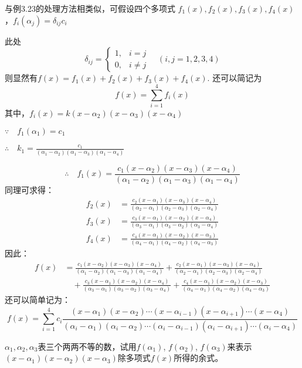 \begin{solution}
    与例3.23的处理方法相类似，可假设四个多项式
$f_1(x),f_2(x),f_3(x),f_4(x)$，$f_i(\alpha_j)=\delta_{ij}c_i$    
    
    此处$$\delta_{ij}=\begin{cases}
        1,& i=j\\
        0,& i\ne j
    \end{cases}\quad  (i,j=1, 2, 3, 4)$$
则显然有$f(x)=f_1(x)+f_2(x)+f_3(x)+f_4(x)$.
还可以简记为$$f(x)=\sum^4_{i=1}f_i(x)$$
其中，$f_i(x)=k(x-\alpha_2)(x-\alpha_3)(x-\alpha_4)$

$\because\quad f_1(\alpha_1)=c_1$

$\therefore\quad k_1=\frac{c_1}{(\alpha_1-\alpha_2)(\alpha_1-\alpha_3)(\alpha_1-\alpha_4)}$

\[\therefore\quad f_1(x)=\frac{c_1(x-\alpha_2)(x-\alpha_3)(x-\alpha_4)}{(\alpha_1-\alpha_2)(\alpha_1-\alpha_3)(\alpha_1-\alpha_4)}\]
同理可求得：
\[\begin{split}
    f_2(x)&=\frac{c_2(x-\alpha_1)(x-\alpha_3)(x-\alpha_4)}{(\alpha_2-\alpha_1)(\alpha_2-\alpha_3)(\alpha_2-\alpha_4)}\\
    f_3(x)&=\frac{c_3(x-\alpha_1)(x-\alpha_2)(x-\alpha_4)}{(\alpha_3-\alpha_1)(\alpha_3-\alpha_2)(\alpha_3-\alpha_4)}\\
    f_4(x)&=\frac{c_4(x-\alpha_1)(x-\alpha_2)(x-\alpha_3)}{(\alpha_4-\alpha_1)(\alpha_4-\alpha_2)(\alpha_4-\alpha_3)}
\end{split}\]
因此：
\[\begin{split}
f(x)&=\frac{c_1(x-\alpha_2)(x-\alpha_3)(x-\alpha_4)}{(\alpha_1-\alpha_2)(\alpha_1-\alpha_3)(\alpha_1-\alpha_4)}+\frac{c_2(x-\alpha_1)(x-\alpha_3)(x-\alpha_4)}{(\alpha_2-\alpha_1)(\alpha_2-\alpha_3)(\alpha_2-\alpha_4)}\\
&\quad +\frac{c_3(x-\alpha_1)(x-\alpha_2)(x-\alpha_4)}{(\alpha_3-\alpha_1)(\alpha_3-\alpha_2)(\alpha_3-\alpha_4)}+\frac{c_4(x-\alpha_1)(x-\alpha_2)(x-\alpha_3)}{(\alpha_4-\alpha_1)(\alpha_4-\alpha_2)(\alpha_4-\alpha_3)}
\end{split}\]
还可以简单记为：
\[f(x)=\sum^4_{i=1} c_i\frac{(x-\alpha_1)(x-\alpha_2)\cdots (x-\alpha_{i-1})(x-\alpha_{i+1})\cdots (x-\alpha_4)}{(\alpha_i-\alpha_1)(\alpha_i-\alpha_2)\cdots (\alpha_i-\alpha_{i-1})(\alpha_i-\alpha_{i+1})\cdots (\alpha_i-\alpha_4)}\]
\end{solution}


\begin{example}
$\alpha_1,\alpha_2,\alpha_3$表三个两两不等的数，试用$f(\alpha_1)$, $f(\alpha_2)$, $f(\alpha_3)$来表示$(x-\alpha_1)(x-\alpha_2)(x-\alpha_3)$除多项式$f(x)$所得的余式。
\end{example}

